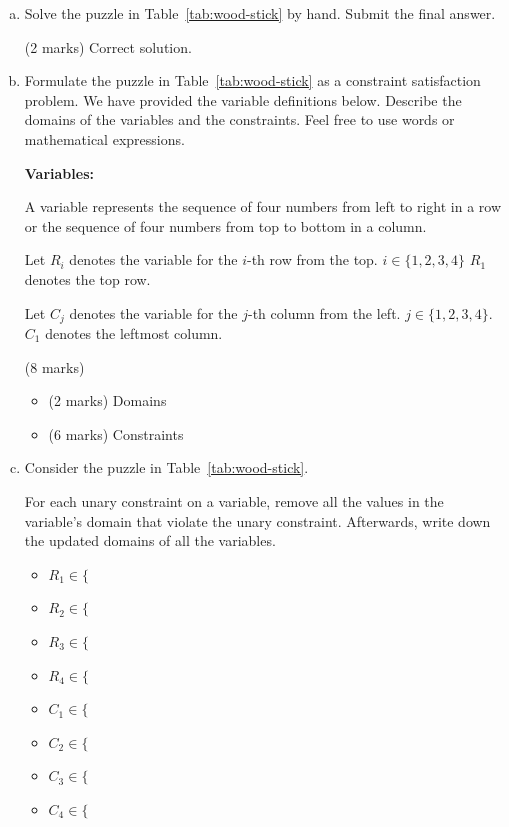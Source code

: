 \documentclass[12pt]{article}
\begin{document}
\begin{enumerate}[(a)]

\item 
\label{csp_1}
Solve the puzzle in Table~\ref{tab:wood-stick} by hand. Submit the final answer. 

\begin{markscheme}
(2 marks) Correct solution.
\end{markscheme}
    
    


\item 
Formulate the puzzle in Table~\ref{tab:wood-stick} as a constraint satisfaction problem. We have provided the variable definitions below. Describe the domains of the variables and the constraints. Feel free to use words or mathematical expressions. 

{\bf Variables: }

A variable represents the sequence of four numbers from left to right in a row or the sequence of four numbers from top to bottom in a column. 

Let $R_i$ denotes the variable for the $i$-th row from the top. $i \in \{1, 2, 3, 4\}$ $R_1$ denotes the top row. 

Let $C_j$ denotes the variable for the $j$-th column from the left. $j \in \{1, 2, 3, 4\}$. $C_1$ denotes the leftmost column.

\begin{markscheme}
(8 marks)

\begin{itemize}
    \item (2 marks) Domains
    \item (6 marks) Constraints
\end{itemize}

\end{markscheme}


\item 
Consider the puzzle in Table~\ref{tab:wood-stick}.

For each unary constraint on a variable, remove all the values in the variable's domain that violate the unary constraint. Afterwards, write down the updated domains of all the variables. 

\begin{itemize}
\item $R_1 \in \{$ 
\item $R_2 \in \{$ 
\item $R_3 \in \{$ 
\item $R_4 \in \{$ 
\item $C_1 \in \{$
\item $C_2 \in \{$
\item $C_3 \in \{$
\item $C_4 \in \{$
\end{itemize}


\end{enumerate}
\end{document}
